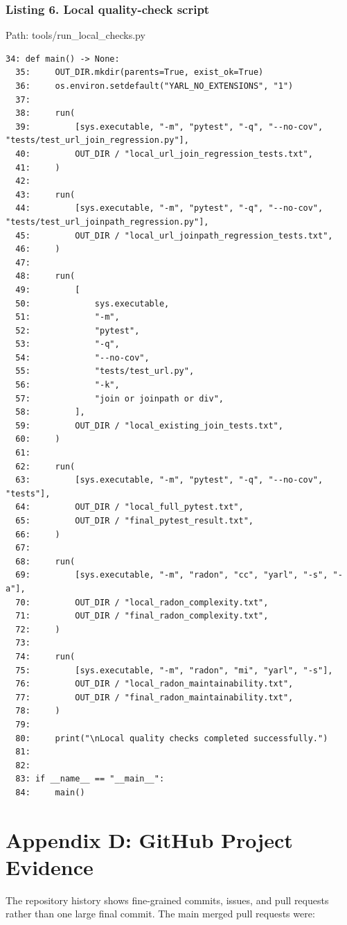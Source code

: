 \documentclass[11pt,a4paper]{article}
\begin{document}
\subsubsection*{Listing 6. Local quality-check script}


Path: tools/run\_local\_checks.py


\begin{Verbatim}[breaklines=true,fontsize=\scriptsize]
34: def main() -> None:
  35:     OUT_DIR.mkdir(parents=True, exist_ok=True)
  36:     os.environ.setdefault("YARL_NO_EXTENSIONS", "1")
  37: 
  38:     run(
  39:         [sys.executable, "-m", "pytest", "-q", "--no-cov", "tests/test_url_join_regression.py"],
  40:         OUT_DIR / "local_url_join_regression_tests.txt",
  41:     )
  42: 
  43:     run(
  44:         [sys.executable, "-m", "pytest", "-q", "--no-cov", "tests/test_url_joinpath_regression.py"],
  45:         OUT_DIR / "local_url_joinpath_regression_tests.txt",
  46:     )
  47: 
  48:     run(
  49:         [
  50:             sys.executable,
  51:             "-m",
  52:             "pytest",
  53:             "-q",
  54:             "--no-cov",
  55:             "tests/test_url.py",
  56:             "-k",
  57:             "join or joinpath or div",
  58:         ],
  59:         OUT_DIR / "local_existing_join_tests.txt",
  60:     )
  61: 
  62:     run(
  63:         [sys.executable, "-m", "pytest", "-q", "--no-cov", "tests"],
  64:         OUT_DIR / "local_full_pytest.txt",
  65:         OUT_DIR / "final_pytest_result.txt",
  66:     )
  67: 
  68:     run(
  69:         [sys.executable, "-m", "radon", "cc", "yarl", "-s", "-a"],
  70:         OUT_DIR / "local_radon_complexity.txt",
  71:         OUT_DIR / "final_radon_complexity.txt",
  72:     )
  73: 
  74:     run(
  75:         [sys.executable, "-m", "radon", "mi", "yarl", "-s"],
  76:         OUT_DIR / "local_radon_maintainability.txt",
  77:         OUT_DIR / "final_radon_maintainability.txt",
  78:     )
  79: 
  80:     print("\nLocal quality checks completed successfully.")
  81: 
  82: 
  83: if __name__ == "__main__":
  84:     main()
\end{Verbatim}


\section*{Appendix D: GitHub Project Evidence}


The repository history shows fine-grained commits, issues, and pull requests rather than one large final commit. The main merged pull requests were:
\end{document}
